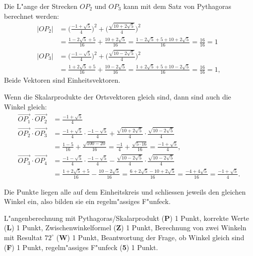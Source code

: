 \begin{loesung}
\begin{teilaufgaben}
\item Die L"ange der Strecken $OP_2$ und $OP_3$ kann mit dem Satz von
Pythagoras berechnet werden:
\begin{align*}
|OP_2|&=
\biggl(\frac{-1+\sqrt{5}}4\biggr)^2+ \biggl(\frac{\sqrt{10+2\sqrt{5}}}4 \biggr)^2
\\
&=\frac{1-2\sqrt{5}+5}{16}+\frac{10+2\sqrt{5}}{16}=\frac{1-2\sqrt{5}+5+10+2\sqrt{5}}{16}=\frac{16}{16}=1\\
|OP_3|&=
\biggl(\frac{-1-\sqrt{5}}4\biggr)^2+\biggl( \frac{\sqrt{10-2\sqrt{5}}}4 \biggr)^2
\\
&=\frac{1+2\sqrt{5}+5}{16}+\frac{10-2\sqrt{5}}{16}=\frac{1+2\sqrt{5}+5+10-2\sqrt{5}}{16}=\frac{16}{16}=1,
\end{align*}
Beide Vektoren sind Einheitsvektoren.
\item Wenn die Skalarprodukte der Ortsvektoren gleich sind, dann sind auch
die Winkel gleich:
\begin{align*}
\overrightarrow{OP_1}\cdot\overrightarrow{OP_2}
&=
\frac{-1+\sqrt{5}}4\\
\overrightarrow{OP_2}\cdot\overrightarrow{OP_3}
&=
\frac{-1+\sqrt{5}}4
\cdot
\frac{-1-\sqrt{5}}4
+
\frac{\sqrt{10+2\sqrt{5}}}4
\cdot
\frac{\sqrt{10-2\sqrt{5}}}4
\\
&=
\frac{1-5}{16}+\frac{\sqrt{100-20}}{16}
=\frac{-1}{4}+\frac{\sqrt{5\cdot 16}}{16}
=\frac{-1+\sqrt{5}}{4},
\\
\overrightarrow{OP_3}\cdot\overrightarrow{OP_4}
&=
\frac{-1-\sqrt{5}}4\cdot
\frac{-1-\sqrt{5}}4
-
 \frac{\sqrt{10-2\sqrt{5}}}4
\cdot
\frac{\sqrt{10-2\sqrt{5}}}4
\\
&=\frac{1+2\sqrt{5}+5}{16}-\frac{10-2\sqrt{5}}{16}
=\frac{6+2\sqrt{5}-10+2\sqrt{5}}{16}
=\frac{-4+4\sqrt{5}}{16}=\frac{-1+\sqrt{5}}{4}.
\end{align*}
\item
Die Punkte liegen alle auf dem Einheitskreis und schliessen jeweils
den gleichen Winkel ein, also bilden sie ein regelm"assiges F"unfeck.
\end{teilaufgaben}
\end{loesung}

\begin{bewertung}
L"angenberechnung mit Pythagoras/Skalarprodukt ({\bf P}) 1 Punkt,
korrekte Werte ({\bf L}) 1 Punkt,
Zwischenwinkelformel ({\bf Z}) 1 Punkt,
Berechnung von zwei Winkeln mit Resultat $72^\circ$ ({\bf W}) 1 Punkt,
Beantwortung der Frage, ob Winkel gleich sind ({\bf F}) 1 Punkt,
regelm"assiges F"unfeck ({\bf 5}) 1 Punkt.
\end{bewertung}

